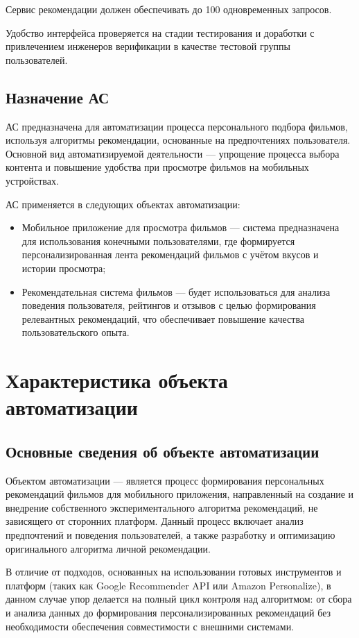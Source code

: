 Сервис рекомендации должен обеспечивать до 100 одновременных запросов.

Удобство интерфейса проверяется на стадии тестирования
и доработки с привлечением инженеров верификации
в качестве тестовой группы пользователей.

\subsection{Назначение АС}

АС предназначена для автоматизации процесса персонального подбора фильмов,
используя алгоритмы рекомендации, основанные на предпочтениях пользователя.
Основной вид автоматизируемой деятельности --- упрощение процесса
выбора контента и повышение удобства при просмотре фильмов на мобильных устройствах.

АС применяется в следующих объектах автоматизации:

\begin{itemize}
	\item Мобильное приложение для просмотра фильмов --- система предназначена
	для использования конечными пользователями, где формируется персонализированная
	лента рекомендаций фильмов с учётом вкусов и истории просмотра;
	\item Рекомендательная система фильмов --- будет использоваться для анализа
	поведения пользователя, рейтингов и отзывов с целью формирования релевантных
	рекомендаций, что обеспечивает повышение качества пользовательского опыта.
\end{itemize}


\section{Характеристика объекта автоматизации}

\subsection{Основные сведения об объекте автоматизации}

Объектом автоматизации --- является процесс формирования персональных рекомендаций фильмов
для мобильного приложения, направленный на создание и внедрение собственного
экспериментального алгоритма рекомендаций, не зависящего от сторонних платформ.
Данный процесс включает анализ предпочтений и поведения пользователей, а также
разработку и оптимизацию оригинального алгоритма личной рекомендации.

В отличие от подходов, основанных на использовании готовых инструментов и платформ
(таких как Google Recommender API или Amazon Personalize), в данном случае упор делается
на полный цикл контроля над алгоритмом: от сбора и анализа данных до формирования
персонализированных рекомендаций без необходимости обеспечения совместимости
с внешними системами.

